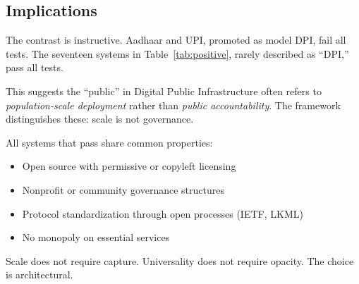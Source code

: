 \subsection{Implications}

The contrast is instructive. Aadhaar and UPI, promoted as model DPI, fail all tests. The seventeen systems in Table~\ref{tab:positive}, rarely described as ``DPI,'' pass all tests.

This suggests the ``public'' in Digital Public Infrastructure often refers to \textit{population-scale deployment} rather than \textit{public accountability}. The framework distinguishes these: scale is not governance.

All systems that pass share common properties:
\begin{itemize}
    \item Open source with permissive or copyleft licensing
    \item Nonprofit or community governance structures
    \item Protocol standardization through open processes (IETF, LKML)
    \item No monopoly on essential services
\end{itemize}

Scale does not require capture. Universality does not require opacity. The choice is architectural.